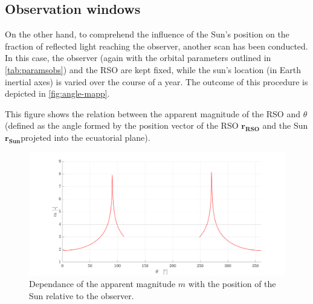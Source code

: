 \subsection{Observation windows}
On the other hand, to comprehend the influence of the Sun's position on the fraction of reflected light reaching the observer, another scan has been conducted. In this case, the observer (again with the orbital parameters outlined in \autoref{tab:paramsobs}) and the RSO are kept fixed, while the sun's location (in Earth inertial axes) is varied over the course of a year. The outcome of this procedure is depicted in \autoref{fig:angle-mapp}.

This figure shows the relation between the apparent magnitude of the RSO and $\theta$ (defined as the angle formed by the position vector of the RSO $\boldsymbol{r_{RSO}}$ and the Sun $\boldsymbol{r_{Sun}}$projeted into the ecuatorial plane).
\begin{figure}[H]
    \centering
    \includegraphics[width=\textwidth]{Figures/anglesunRSO-mapp.png}
    \caption{Dependance of the apparent magnitude $m$ with the position of the Sun relative to the observer.}
    \label{fig:angle-mapp}
\end{figure}

